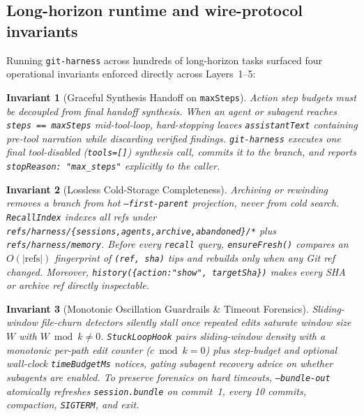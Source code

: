 \documentclass[11pt]{article}
\newcommand{\code}[1]{\nolinkurl{#1}}
\newtheorem{invariant}{Invariant}
\begin{document}
\subsection{Long-horizon runtime and wire-protocol invariants}
\label{sec:invariants}
Running \texttt{git-harness} across hundreds of long-horizon tasks surfaced four operational invariants enforced directly across Layers~1--5:

\begin{invariant}[Graceful Synthesis Handoff on \texttt{maxSteps}]
Action step budgets must be decoupled from final handoff synthesis. When an agent or subagent reaches \texttt{steps == maxSteps} mid-tool-loop, hard-stopping leaves \texttt{assistantText} containing pre-tool narration while discarding verified findings. \texttt{git-harness} executes one final tool-disabled (\texttt{tools=[]}) synthesis call, commits it to the branch, and reports \texttt{stopReason: "max\_steps"} explicitly to the caller.
\end{invariant}

\begin{invariant}[Lossless Cold-Storage Completeness]
Archiving or rewinding removes a branch from hot \texttt{--first-parent} projection, never from cold search. \texttt{RecallIndex} indexes all refs under \code{refs/harness/{sessions,agents,archive,abandoned}/*} plus \code{refs/harness/memory}. Before every \texttt{recall} query, \texttt{ensureFresh()} compares an $O(|\text{refs}|)$ fingerprint of \texttt{(ref, sha)} tips and rebuilds only when any Git ref changed. Moreover, \texttt{history(\{action:"show", targetSha\})} makes every SHA or archive ref directly inspectable.
\end{invariant}

\begin{invariant}[Monotonic Oscillation Guardrails \& Timeout Forensics]
Sliding-window file-churn detectors silently stall once repeated edits saturate window size $W$ with $W \bmod k \neq 0$. \texttt{StuckLoopHook} pairs sliding-window density with a monotonic per-path edit counter ($c \bmod k = 0$) plus step-budget and optional wall-clock \texttt{timeBudgetMs} notices, gating subagent recovery advice on whether subagents are enabled. To preserve forensics on hard timeouts, \texttt{--bundle-out} atomically refreshes \texttt{session.bundle} on commit~1, every 10 commits, compaction, \texttt{SIGTERM}, and exit.
\end{invariant}
\end{document}
